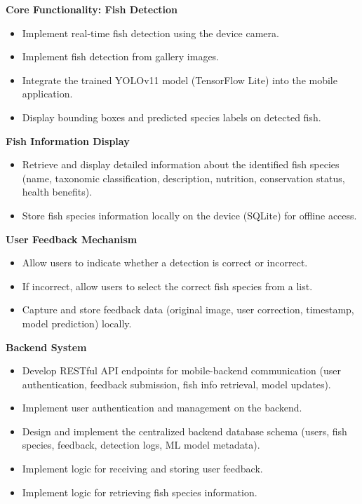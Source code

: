 \noindent\textbf{Core Functionality: Fish Detection}
\begin{itemize}
    \item Implement real-time fish detection using the device camera.
    \item Implement fish detection from gallery images.
    \item Integrate the trained YOLOv11 model (TensorFlow Lite) into the mobile application.
    \item Display bounding boxes and predicted species labels on detected fish.
\end{itemize}

\noindent\textbf{Fish Information Display}
\begin{itemize}
    \item Retrieve and display detailed information about the identified fish species (name, taxonomic classification, description, nutrition, conservation status, health benefits).
    \item Store fish species information locally on the device (SQLite) for offline access.
\end{itemize}

\noindent\textbf{User Feedback Mechanism}
\begin{itemize}
    \item Allow users to indicate whether a detection is correct or incorrect.
    \item If incorrect, allow users to select the correct fish species from a list.
    \item Capture and store feedback data (original image, user correction, timestamp, model prediction) locally.
\end{itemize}

\noindent\textbf{Backend System}
\begin{itemize}
    \item Develop RESTful API endpoints for mobile-backend communication (user authentication, feedback submission, fish info retrieval, model updates).
    \item Implement user authentication and management on the backend.
    \item Design and implement the centralized backend database schema (users, fish species, feedback, detection logs, ML model metadata).
    \item Implement logic for receiving and storing user feedback.
    \item Implement logic for retrieving fish species information.
\end{itemize}

